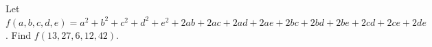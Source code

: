 Let $f(a,b,c,d,e)=a^2+b^2+c^2+d^2+e^2+2ab+2ac+2ad+2ae+2bc+2bd+2be+2cd+2ce+2de$. Find $f(13,27,6,12,42)$.
